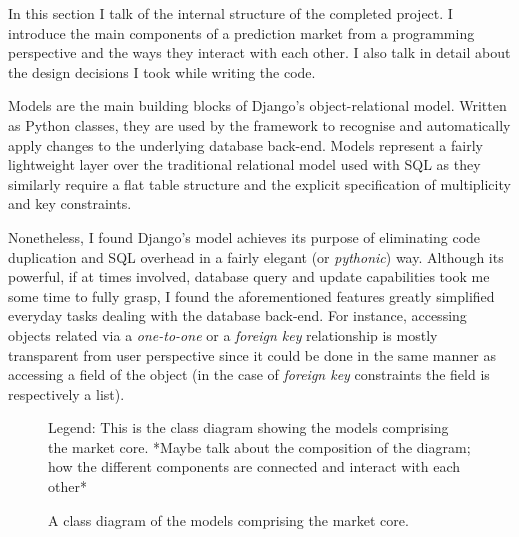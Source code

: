 \documentclass[bsc,frontabs,twoside,singlespacing,parskip,deptreport]{infthesis}     %
\begin{document}
In this section I talk of the internal structure of the completed project. I introduce the main components of a prediction market from a programming perspective and the ways they interact with each other. I also talk in detail about the design decisions I took while writing the code.

    Models are the main building blocks of Django's object-relational model. Written as Python classes, they are used by the framework to recognise and automatically apply changes to the underlying database back-end. Models represent a fairly lightweight layer over the traditional relational model used with SQL as they similarly require a flat table structure and the explicit specification of multiplicity and key constraints. 

	Nonetheless, I found Django's model achieves its purpose of eliminating code duplication and SQL overhead in a fairly elegant (or {\em pythonic}) way. Although its powerful, if at times involved, database query and update capabilities took me some time to fully grasp, I found the aforementioned features greatly simplified everyday tasks dealing with the database back-end. For instance, accessing objects related via a {\it one-to-one} or a {\it foreign key} relationship is mostly transparent from user perspective since it could be done in the same manner as accessing a field of the object (in the case of {\it foreign key} constraints the field is respectively a list). 

\begin{figure}
\caption{A class diagram of the models comprising the market core. }
\noindent{}
\label{fig:class-diagram}
{Legend: This is the class diagram showing the models comprising the market core. *Maybe talk about the composition of the diagram; how the different components are connected and interact with each other*}
\end{figure}
\end{document}
